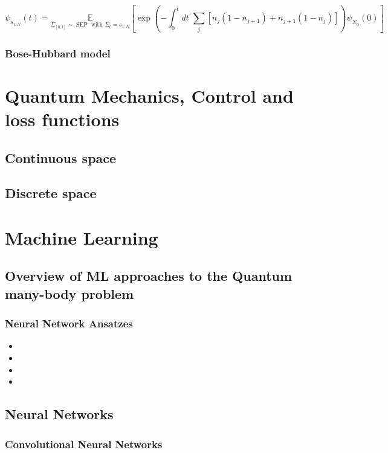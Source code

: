 \begin{equation}
	\psi_{s_{1: N}}(t)=\underset{\Sigma_{[0, t]} \sim \operatorname{SEP} \text{ with } \Sigma_{t}=s_{1: N}}{\mathbb{E}}
\left[\exp \left(-\int_{0}^{t} d t^{\prime} \sum_{j}\left[n_{j}\left(1-n_{j+1}\right)+n_{j+1}\left(1-n_{j}\right)\right]\right) \psi_{\Sigma_{0}}(0)\right]
\end{equation}

\subsubsection{Bose-Hubbard model}

\newpage
\section{Quantum Mechanics, Control and loss functions}

\subsection{Continuous space}

\subsection{Discrete space}



\newpage
\section{Machine Learning}
\label{sec:ml}

\subsection{Overview of ML approaches to the Quantum many-body problem}
\label{subsec:ml-overview}

\subsubsection{Neural Network Ansatzes}
\begin{itemize}
	\item
	\item
	\item
	\item
\end{itemize}

\subsection{Neural Networks}

\subsubsection{Convolutional Neural Networks}
\label{subsubsec:ml-cnn}

